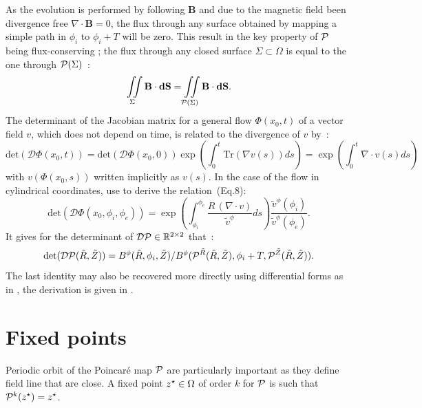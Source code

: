 As the evolution is performed by following $\mathbf{B}$ and due to the magnetic field been divergence free $\nabla\cdot\textbf{B} = 0$, the flux through any surface obtained by mapping a simple path in $\phi_i$ to $\phi_i + T$ will be zero. This result in the key property of $\mathcal{P}$ being flux-conserving ; the flux through any closed surface $\Sigma \subset \Omega$ is equal to the one through $\mathcal{P}(\Sigma)$~:
\begin{equation*}
    \iint\limits_{\Sigma}\textbf{B}\cdot\textbf{dS} = \iint\limits_{\mathcal{P}(\Sigma)}\textbf{B}\cdot\textbf{dS}.
\end{equation*}
The determinant of the Jacobian matrix for a general flow $\Phi(x_0, t)$ of a vector field $v$, which does not depend on time, is related to the divergence of $v$ \cite[p.408]{hirsch_differential_2013} by~:
\begin{equation}\label{eq:det-div-flow}
    \text{det}(\mathcal{D}\Phi(x_0, t)) = \text{det}(\mathcal{D}\Phi(x_0, 0))\exp\left(\int_0^t\text{Tr}(\nabla v(s)) ds\right) = \exp\left(\int_0^t \nabla\cdot v(s) ds\right)
\end{equation}
with $v(\Phi(x_0, s))$ written implicitly as $v(s)$. In the case of the flow in cylindrical coordinates, \citeauthor{wei_invariant_2023} use  to derive the relation~(Eq.8):
\begin{equation*}\label{eq:det-div-pmap}
    \text{det}(\mathcal{D}\Phi(x_0, \phi_i, \phi_e)) = \exp\left(\int_{\phi_i}^{\phi_e} \frac{R\,(\nabla\cdot v)}{\tilde{v}^\phi} ds\right)\frac{\tilde{v}^\phi(\phi_i)}{\tilde{v}^\phi(\phi_e)}.
\end{equation*}
It gives for the determinant of $\mathcal{D}\mathcal{P} \in \mathbb{R}^{2\times2}$ that~:
\begin{equation}\label{eq:pmap-det}
    \text{det}(\mathcal{D}\mathcal{P}(\tilde{R}, \tilde{Z})) = B^\phi(\tilde{R},\phi_i, \tilde{Z})/B^\phi(\mathcal{P}^{\tilde{R}}(\tilde{R},\tilde{Z}), \phi_i+T,\mathcal{P}^{\tilde{Z}}(\tilde{R},\tilde{Z})).
\end{equation}
The last identity may also be recovered more directly using differential forms as in \cite{meiss_thirty_2015}, the derivation is given in .

\section{Fixed points}
Periodic orbit of the Poincaré map $\mathcal{P}$ are particularly important as they define field line that are close. A fixed point $z^\star\in\Omega$ of order $k$ for $\mathcal{P}$ is such that $\mathcal{P}^k(z^\star) = z^\star$. 

